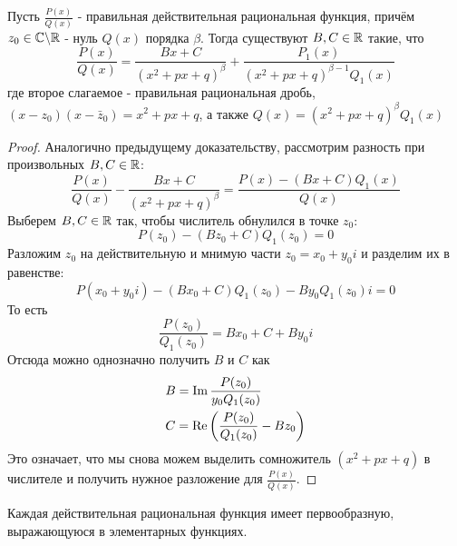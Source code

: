 \begin{lemma}
	Пусть $\frac{P(x)}{Q(x)}$ - правильная действительная рациональная функция, причём $z_0 \in \mathbb{C} \backslash \mathbb{R}$ - нуль $Q(x)$ порядка $\beta$. Тогда существуют $B, C \in \mathbb{R}$ такие, что
	\[
		\frac{P(x)}{Q(x)} = \frac{Bx + C}{(x^2 + px + q)^\beta} + \frac{P_1(x)}{(x^2 + px + q)^{\beta - 1} Q_1(x)}
	\]
	где второе слагаемое - правильная рациональная дробь, $(x - z_0)(x - \bar{z}_0) = x^2 + px + q$, а также $Q(x) = (x^2 + px + q)^\beta Q_1(x)$
\end{lemma}

\begin{proof}
	Аналогично предыдущему доказательству, рассмотрим разность при произвольных $B, C \in \mathbb{R}$:
	\[
		\frac{P(x)}{Q(x)} - \frac{Bx + C}{(x^2 + px + q)^\beta} = \frac{P(x) - (Bx + C)Q_1(x)}{Q(x)}
	\]
	Выберем $B, C \in \mathbb{R}$ так, чтобы числитель обнулился в точке $z_0$:
	\[
		P(z_0) - (Bz_0 + C)Q_1(z_0) = 0
	\]
	Разложим $z_0$ на действительную и мнимую части $z_0 = x_0 + y_0 i$ и разделим их в равенстве:
	\[
		P(x_0 + y_0 i) - (Bx_0 + C)Q_1(z_0) - By_0 Q_1(z_0) i = 0
	\]
	То есть
	\[
		\frac{P(z_0)}{Q_1(z_0)} = Bx_0 + C + By_0 i
	\]
	Отсюда можно однозначно получить $B$ и $C$ как
	\begin{align*}
		&{B = \operatorname{Im} \frac{P(z_0)}{y_0 Q_1(z_0)}}
		\\
		&{C = \operatorname{Re} \left(\frac{P(z_0)}{Q_1(z_0)} - Bz_0\right)}
	\end{align*}
	Это означает, что мы снова можем выделить сомножитель $(x^2 + px + q)$ в числителе и получить нужное разложение для $\frac{P(x)}{Q(x)}$.
\end{proof}

\begin{theorem}
	Каждая действительная рациональная функция имеет первообразную, выражающуюся в элементарных функциях.
\end{theorem}

